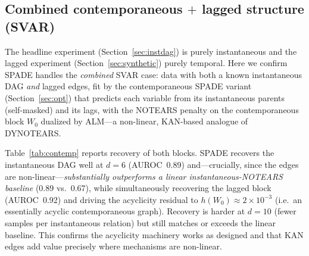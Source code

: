 \begin{table}[t]
\centering
\caption{Paired Wilcoxon signed-rank tests (two-sided; SPADE vs.\ each baseline,
F1 across matched configuration/seed pairs). SPADE significantly beats
Neural-GC, NOTEARS, and GC-KAN$+$ALM ($p<0.05$), ties GC-KAN, NTS-NOTEARS,
and Correlation ($p>0.05$), and trails
PCMCI, VAR-LiNGAM, VAR-Lasso, and GOLEM
($p<0.01$).}
\label{tab:causal_stats}
\end{table}

\subsection{Combined contemporaneous $+$ lagged structure (SVAR)}
\label{sec:contemp}

The headline experiment (Section~\ref{sec:instdag}) is purely instantaneous and
the lagged experiment (Section~\ref{sec:synthetic}) purely temporal. Here we
confirm SPADE handles the \emph{combined} SVAR case: data with both a known
instantaneous DAG \emph{and} lagged edges, fit by the contemporaneous SPADE
variant (Section~\ref{sec:opt}) that predicts each variable from its instantaneous
parents (self-masked) and its lags, with the NOTEARS penalty on the contemporaneous
block $W_0$ dualized by ALM---a non-linear, KAN-based analogue of DYNOTEARS.

Table~\ref{tab:contemp} reports recovery of both blocks. SPADE recovers the
instantaneous DAG well at $d{=}6$ (AUROC~0.89) and---crucially, since the edges
are non-linear---\emph{substantially outperforms a linear instantaneous-NOTEARS
baseline} (0.89 vs.\ 0.67), while simultaneously recovering the lagged block
(AUROC~0.92) and driving the acyclicity residual to $h(W_0)\!\approx\!2\times10^{-3}$
(i.e.\ an essentially acyclic contemporaneous graph). Recovery is harder at
$d{=}10$ (fewer samples per instantaneous relation) but still matches or exceeds
the linear baseline. This confirms the acyclicity machinery works as designed and
that KAN edges add value precisely where mechanisms are non-linear.

\begin{table}[t]
\centering
\caption{Instantaneous-DAG recovery on SVAR data with a known contemporaneous DAG
$+$ lagged edges (mean over 5 seeds). SPADE recovers both blocks and keeps
$h(W_0)\!\to\!0$; on these non-linear instantaneous edges it beats linear NOTEARS.}
\label{tab:contemp}
\end{table}

